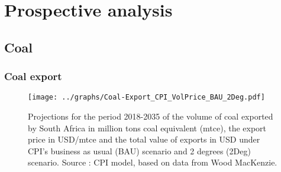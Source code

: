 \documentclass[12pt,english]{article}
\begin{document}
\clearpage
\section{Prospective analysis}

\subsection{Coal}

\subsubsection{Coal export}


\begin{figure}[!h]
	\centering
	\texttt{[image: ../graphs/Coal-Export\_CPI\_VolPrice\_BAU\_2Deg.pdf]}
	\caption{\label{Coal-Export_CPI_VolPrice_BAU_2Deg}\small Projections for the period 2018-2035 of the volume of coal exported by South Africa in million tons coal equivalent (mtce), the export price in USD/mtce and the total value of exports in USD under CPI's business as usual (BAU) scenario and 2 degrees (2Deg) scenario. Source : CPI model, based on data from Wood MacKenzie.}
\end{figure}
\end{document}
